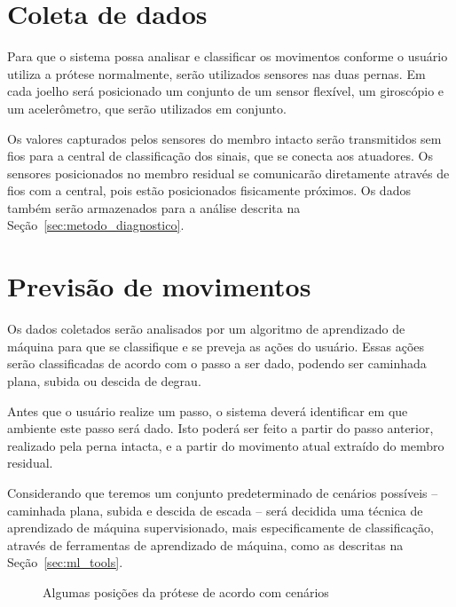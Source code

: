 \section{Coleta de dados}\label{sec:metodo_coleta}

Para que o sistema possa analisar e classificar os movimentos conforme o usuário utiliza a prótese normalmente, serão utilizados sensores nas duas pernas. Em cada joelho será posicionado um conjunto de um sensor flexível, um giroscópio e um acelerômetro, que serão utilizados em conjunto.

Os valores capturados pelos sensores do membro intacto serão transmitidos sem fios para a central de classificação dos sinais, que se conecta aos atuadores. Os sensores posicionados no membro residual se comunicarão diretamente através de fios com a central, pois estão posicionados fisicamente próximos. Os dados também serão armazenados para a análise descrita na Seção~\ref{sec:metodo_diagnostico}.

\section{Previsão de movimentos}\label{sec:metodo_previsao}
Os dados coletados serão analisados por um algoritmo de aprendizado de máquina para que se classifique e se preveja as ações do usuário. Essas ações serão classificadas de acordo com o passo a ser dado, podendo ser caminhada plana, subida ou descida de degrau.

Antes que o usuário realize um passo, o sistema deverá identificar em que ambiente este passo será dado. Isto poderá ser feito a partir do passo anterior, realizado pela perna intacta, e a partir do movimento atual extraído do membro residual.

Considerando que teremos um conjunto predeterminado de cenários possíveis -- caminhada plana, subida e descida de escada -- será decidida uma técnica de aprendizado de máquina supervisionado, mais especificamente de classificação, através de ferramentas de aprendizado de máquina, como as descritas na Seção~\ref{sec:ml_tools}.

\begin{figure}[h]
	\caption{\label{fig:hardware_poses}Algumas posições da prótese de acordo com cenários}
	\begin{center}
	\end{center}
\end{figure}

